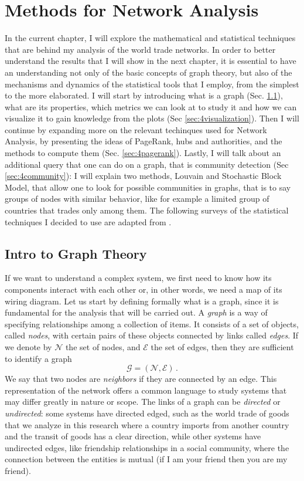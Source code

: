 \chapter{Methods for Network Analysis}\label{ch:3methods}

In the current chapter, I will explore the mathematical and statistical techniques that are behind my analysis of the world trade networks. In order to better understand the results that I will show in the next chapter, it is essential to have an understanding not only of the basic concepts of graph theory, but also of the mechanisms and dynamics of the statistical tools that I employ, from the simplest to the more elaborated. I will start by introducing what is a graph (Sec. \ref{sec:4graphtheory}), what are its properties, which metrics we can look at to study it and how we can visualize it to gain knowledge from the plots (Sec \ref{sec:4visualization}). Then I will continue by expanding more on the relevant techinques used for Network Analysis, by presenting the ideas of PageRank, hubs and authorities, and the methods to compute them (Sec. \ref{sec:4pagerank}). Lastly, I will talk about an additional query that one can do on a graph, that is community detection (Sec \ref{sec:4community}): I will explain two methods, Louvain and Stochastic Block Model, that allow one to look for possible communities in graphs, that is to say groups of nodes with similar behavior, like for example a limited group of countries that trades only among them. The following surveys of the statistical techniques I decided to use are adapted from \textcite{barabasi2016network,easley2012networks}.

\section{Intro to Graph Theory}\label{sec:4graphtheory}

If we want to understand a complex system, we first need to know how its components interact with each other or, in other words, we need a map of its wiring diagram.
Let us start by defining formally what is a graph, since it is fundamental for the analysis that will be carried out. 
A \textit{graph} is a way of specifying relationships among a collection of items. It consists of a set of objects, called \textit{nodes}, with certain pairs of these objects connected by links called \textit{edges}. If we denote by $\mathcal{N}$ the set of nodes, and $\mathcal{E}$ the set of edges, then they are sufficient to identify a graph 
\[ 
    \mathcal{G} = (\mathcal{N},\mathcal{E})\,. 
\]
We say that two nodes are \textit{neighbors} if they are connected by an edge. This representation of the network offers a common language to study systems that may differ greatly in nature or scope. The links of a graph can be \textit{directed} or \textit{undirected}: some systems have directed edged, such as the world trade of goods that we analyze in this research where a country imports from another country and the transit of goods has a clear direction, while other systems have undirected edges, like friendship relationships in a social community, where the connection between the entities is mutual (if I am your friend then you are my friend).

